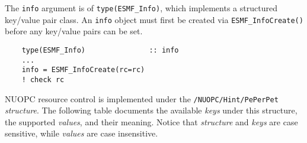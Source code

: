 The {\tt info} argument is of {\tt type(ESMF\_Info)}, which implements a structured key/value pair class. An {\tt info} object must first be created via {\tt ESMF\_InfoCreate()} before any key/value pairs can be set.

\begin{verbatim}
    type(ESMF_Info)               :: info
    ...
    info = ESMF_InfoCreate(rc=rc)
    ! check rc
\end{verbatim}

NUOPC resource control is implemented under the {\tt /NUOPC/Hint/PePerPet} {\em structure}. The following table documents the available {\em keys} under this structure, the supported {\em values}, and their meaning. Notice that {\em structure} and {\em keys} are case sensitive, while {\em values} are case insensitive.

